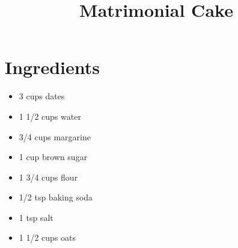 \documentclass[notitlepage,12pt]{report}
\title{Matrimonial Cake\vspace{-1em}}
\date{}
\providecommand{\tightlist}{%
  \setlength{\itemsep}{0pt}\setlength{\parskip}{0pt}}
\begin{document}
\maketitle

\begin{minipage}[t]{0.4\textwidth}\vspace{0pt}

\hypertarget{ingredients}{%
\section*{Ingredients}\label{ingredients}}

\begin{itemize}[leftmargin=*]
\tightlist
\item
  3 cups dates
\item
  1 1/2 cups water
\item
  3/4 cups margarine
\item
  1 cup brown sugar
\item
  1 3/4 cups flour
\item
  1/2 tsp baking soda
\item
  1 tsp salt
\item
  1 1/2 cups oats
\end{itemize}



\end{minipage}%
\hfill
\end{document}
